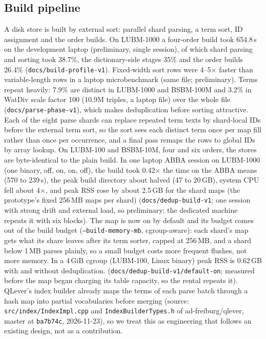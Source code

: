\documentclass[sigconf, nonacm]{acmart}
\begin{document}
\subsection{Build pipeline}
A disk store is built by external sort: parallel shard parsing, a term sort, ID assignment and the order builds. On LUBM-1000 a four-order build took 654.8\,s on the development laptop (preliminary, single session), of which shard parsing and sorting took 38.7\%, the dictionary-side stages 35\% and the order builds 26.4\%
(\texttt{docs/build-profile-v1}). Fixed-width sort rows were 4--5$\times$ faster than variable-length rows in a laptop microbenchmark (same file; preliminary). Terms repeat heavily: 7.9\% are distinct in LUBM-1000 and BSBM-100M and 3.2\% in WatDiv scale factor 100 (10.9M triples, a laptop file) over the whole file
(\texttt{docs/parse-phase-v1}), which makes deduplication before sorting attractive. Each of the eight parse shards can replace repeated term texts by shard-local IDs before the external term sort, so the sort sees each distinct term once per map fill rather than once per occurrence, and a final pass remaps the rows to global IDs by array lookup. On LUBM-100 and BSBM-10M, four and six orders, the stores are byte-identical to the plain build. In one laptop ABBA session on LUBM-1000 (one binary, off, on, on, off), the build took 0.42$\times$ the time on the ABBA means (570 to 239\,s), the peak build directory about halved (47 to 20\,GB), system CPU fell about 4$\times$, and peak RSS rose by about 2.5\,GB for the shard maps (the prototype's fixed 256\,MB maps per shard) (\texttt{docs/dedup-build-v1}; one session with strong drift and external load, so preliminary; the dedicated machine repeats it with six blocks). The map is now on by default and its budget comes out of the build budget (\texttt{--build-memory-mb}, cgroup-aware): each shard's map gets what its share leaves after its term sorter, capped at 256\,MB, and a shard below 1\,MB parses plainly, so a small budget costs more frequent flushes, not more memory. In a 4\,GiB cgroup (LUBM-100, Linux binary) peak RSS is 0.62\,GB with and without deduplication. (\texttt{docs/dedup-build-v1/default-on}; measured before the map began charging its table capacity, so the rental repeats it).
QLever's index builder already maps the terms of each parse batch through a hash map into partial vocabularies before merging (source: \texttt{src/index/IndexImpl.cpp} and \texttt{IndexBuilderTypes.h} of ad-freiburg/qlever, master at \texttt{ba7b74c}, 2026-11-23), so we treat this as engineering that follows an existing design, not as a contribution.
\end{document}
